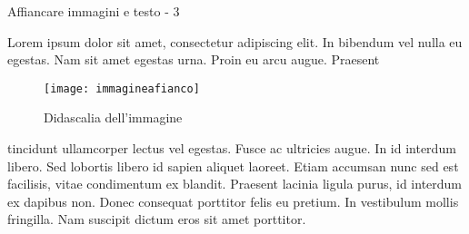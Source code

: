 \begin{frame}{Affiancare immagini e testo - 3}

Lorem ipsum dolor sit amet, consectetur adipiscing elit. In bibendum vel nulla eu egestas. Nam sit amet egestas urna. Proin eu arcu augue. Praesent
\begin{wrapfigure}{r}{5cm}
    \texttt{[image: immagineafianco]}
    \caption{Didascalia dell'immagine}
\end{wrapfigure} 
tincidunt ullamcorper lectus vel egestas. Fusce ac ultricies augue. In id interdum libero. Sed lobortis libero id sapien aliquet laoreet. Etiam accumsan nunc sed est facilisis, vitae condimentum ex blandit. Praesent lacinia ligula purus, id interdum ex dapibus non. Donec consequat porttitor felis eu pretium. In vestibulum mollis fringilla. Nam suscipit dictum eros sit amet porttitor.

\end{frame}